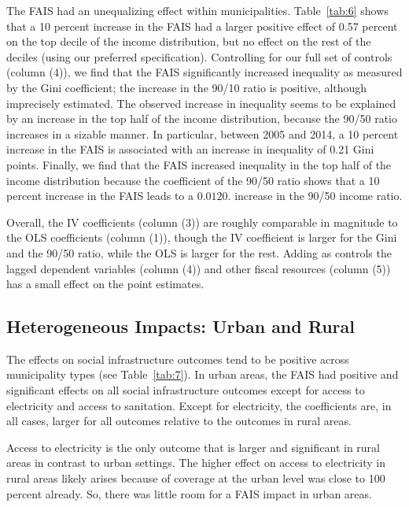 \documentclass[dv_diss_main.tex]{subfiles}
\begin{document}
The FAIS had an unequalizing effect within municipalities. Table~\ref{tab:6} shows that a 10 percent increase in the FAIS had a larger positive effect of 0.57 percent on the top decile of the income distribution, but no effect on the rest of the deciles (using our preferred specification). Controlling for our full set of controls (column (4)), we find that the FAIS significantly increased inequality as measured by the Gini coefficient; the increase in the 90/10 ratio is positive, although imprecisely estimated. The observed increase in inequality seems to be explained by an increase in the top half of the income distribution, because the 90/50 ratio increases in a sizable manner. In particular, between 2005 and 2014, a 10 percent increase in the FAIS is associated with an increase in inequality of 0.21 Gini points. Finally, we find that the FAIS increased inequality in the top half of the income distribution because the coefficient of the 90/50 ratio shows that a 10 percent increase in the FAIS leads to a $0.012$0. increase in the 90/50 income ratio.

Overall, the IV coefficients (column (3)) are roughly comparable in magnitude to the OLS coefficients (column (1)), though the IV coefficient is larger for the Gini and the 90/50 ratio, while the OLS is larger for the rest. Adding as controls the lagged dependent variables (column (4)) and other fiscal resources (column (5)) has a small effect on the point estimates.

\subsection{Heterogeneous Impacts: Urban and Rural} \label{subsec:heterogeneous} 

The effects on social infrastructure outcomes tend to be positive across municipality types (see Table~\ref{tab:7}). In urban areas, the FAIS had positive and significant effects on all social infrastructure outcomes except for access to electricity and access to sanitation. Except for electricity, the coefficients are, in all cases, larger for all outcomes relative to the outcomes in rural areas.

Access to electricity is the only outcome that is larger and significant in rural areas in contrast to urban settings. The higher effect on access to electricity in rural areas likely arises because of coverage at the urban level was close to 100 percent already. So, there was little room for a FAIS impact in urban areas.
\end{document}
